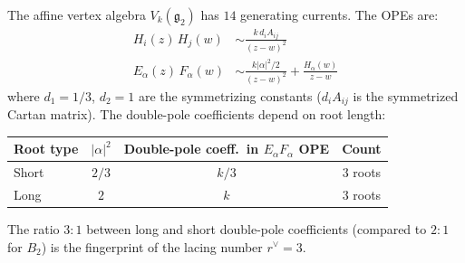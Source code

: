 \begin{computation}\label{comp:G2-ope}
The affine vertex algebra $V_k(\mathfrak{g}_2)$ has $14$ generating
currents.  The OPEs are:
\begin{align}
H_i(z)\, H_j(w) &\sim \frac{k\, d_i A_{ij}}{(z-w)^2}
  \label{eq:G2-HH} \\
E_\alpha(z)\, F_\alpha(w) &\sim
  \frac{k |\alpha|^2/2}{(z-w)^2}
  + \frac{H_\alpha(w)}{z-w}
  \label{eq:G2-EF}
\end{align}
where $d_1 = 1/3$, $d_2 = 1$ are the symmetrizing constants
($d_i A_{ij}$ is the symmetrized Cartan matrix).
The double-pole coefficients depend on root length:
\begin{center}
\renewcommand{\arraystretch}{1.2}
\begin{tabular}{lccc}
\textbf{Root type} & \textbf{$|\alpha|^2$} &
\textbf{Double-pole coeff.\ in $E_\alpha F_\alpha$ OPE} &
\textbf{Count} \\
\hline
Short & $2/3$ & $k/3$ & $3$ roots \\
Long & $2$ & $k$ & $3$ roots
\end{tabular}
\end{center}
The ratio $3:1$ between long and short double-pole coefficients
(compared to $2:1$ for $B_2$) is the fingerprint of the
lacing number $r^\vee = 3$.
\end{computation}

